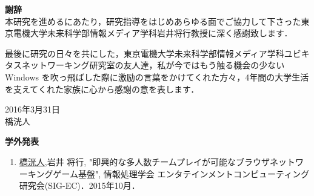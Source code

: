 \newpage
\pagestyle{plain}


\begin{flushleft}
{\huge{\bf 謝辞}}\\
\vspace{1cm}
本研究を進めるにあたり，研究指導をはじめあらゆる面でご協力して下さった東京電機大学未来科学部情報メディア学科岩井将行教授に深く感謝致します．
\par
最後に研究の日々を共にした，東京電機大学未来科学部情報メディア学科ユビキタスネットワーキング研究室の友人達，私が今ではもう触る機会の少ない Windows を吹っ飛ばした際に激励の言葉をかけてくれた方々，4年間の大学生活を支えてくれた家族に心から感謝の意を表します．\\

\vspace{3cm}
\begin{flushright}
2016年3月31日\\
橋洸人\\
\end{flushright}
\end{flushleft}



\newpage




\begin{flushleft}
{\huge{\bf 学外発表}}\\
\vspace{1cm}
\begin{enumerate}
	
\item \underline{橋洸人},岩井 将行, "即興的な多人数チームプレイが可能なブラウザネットワーキングゲーム基盤", 情報処理学会 エンタテインメントコンピューティング研究会(SIG-EC)．2015年10月．

\end{enumerate}
\end{flushleft}

\newpage

\renewcommand{\bibname}{参考文献}

